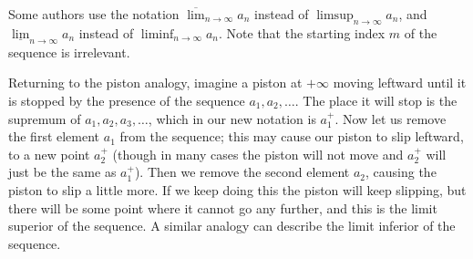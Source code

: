 \setcounter{thm}{10}
\begin{rmk}\label{6.4.11}
  Some authors use the notation \(\overline{\lim}_{n \to \infty} a_n\) instead of \(\limsup_{n \to \infty} a_n\), and \(\underline{\lim}_{n \to \infty} a_n\) instead of \(\liminf_{n \to \infty} a_n\).
  Note that the starting index \(m\) of the sequence is irrelevant.
\end{rmk}

\begin{note}
  Returning to the piston analogy, imagine a piston at \(+\infty\) moving leftward until it is stopped by the presence of the sequence \(a_1, a_2, \dots\).
  The place it will stop is the supremum of \(a_1, a_2, a_3, \dots\), which in our new notation is \(a_1^+\).
  Now let us remove the first element \(a_1\) from the sequence;
  this may cause our piston to slip leftward, to a new point \(a_2^+\)
  (though in many cases the piston will not move and \(a_2^+\) will just be the same as \(a_1^+\)).
  Then we remove the second element \(a_2\), causing the piston to slip a little more.
  If we keep doing this the piston will keep slipping, but there will be some point where it cannot go any further, and this is the limit superior of the sequence.
  A similar analogy can describe the limit inferior of the sequence.
\end{note}

